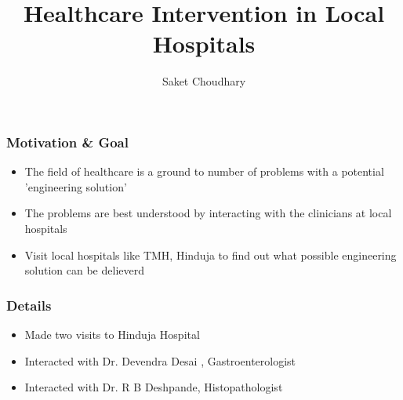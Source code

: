 \documentclass{beamer}
\begin{document}
\title[Healthcare Intervention in Local Hospitals]
{Healthcare Intervention in Local Hospitals
}
\author[\insertframenumber/\inserttotalframenumber
\hspace{1in} Saket Choudhary]
{Saket Choudhary \\
}
\begin{frame}
   \titlepage
\vspace{-1cm}

\end{frame}

\begin{frame}
\frametitle{Motivation \& Goal}
    \begin{itemize}
        \item The  field of healthcare is a ground to number of problems with a potential 'engineering solution'
        \item The problems are best understood by interacting with the clinicians at local hospitals 
        \item Visit local hospitals like TMH, Hinduja to find out what possible engineering solution can be delieverd 
    \end{itemize}
\end{frame}

\begin{frame}
\frametitle{Details}
    \begin{itemize}
        \item  Made two visits to Hinduja Hospital
        \item  Interacted with Dr. Devendra Desai , Gastroenterologist
        \item  Interacted with Dr. R B Deshpande,  Histopathologist
    \end{itemize}
\end{frame}
\end{document}
